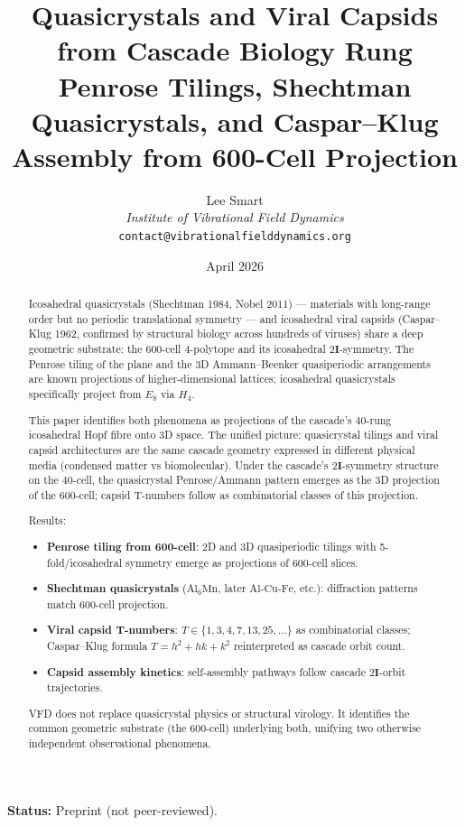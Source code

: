 \documentclass[12pt]{article}
\title{Quasicrystals and Viral Capsids from Cascade Biology Rung\\[6pt]
\large Penrose Tilings, Shechtman Quasicrystals, and Caspar--Klug Assembly from 600-Cell Projection}
\author{Lee Smart\\ \textit{Institute of Vibrational Field Dynamics}\\ \texttt{contact@vibrationalfielddynamics.org}}
\date{April 2026}
\theoremstyle{remark}
\newcommand{\twoI}{2\mathbf{I}}
\begin{document}
\maketitle

\noindent\textbf{Status:} Preprint (not peer-reviewed).

\begin{abstract}
Icosahedral quasicrystals (Shechtman 1984, Nobel 2011) --- materials with long-range order but no periodic translational symmetry --- and icosahedral viral capsids (Caspar--Klug 1962, confirmed by structural biology across hundreds of viruses) share a deep geometric substrate: the 600-cell 4-polytope and its icosahedral $\twoI$-symmetry. The Penrose tiling of the plane and the 3D Ammann--Beenker quasiperiodic arrangements are known projections of higher-dimensional lattices; icosahedral quasicrystals specifically project from $E_8$ via $H_4$.

This paper identifies both phenomena as projections of the cascade's $40$-rung icosahedral Hopf fibre onto 3D space. The unified picture: quasicrystal tilings and viral capsid architectures are the same cascade geometry expressed in different physical media (condensed matter vs biomolecular). Under the cascade's $\twoI$-symmetry structure on the 40-cell, the quasicrystal Penrose/Ammann pattern emerges as the 3D projection of the 600-cell; capsid T-numbers follow as combinatorial classes of this projection.

Results:
\begin{itemize}
\item \textbf{Penrose tiling from 600-cell}: 2D and 3D quasiperiodic tilings with 5-fold/icosahedral symmetry emerge as projections of 600-cell slices.
\item \textbf{Shechtman quasicrystals} ($\mathrm{Al}_6\mathrm{Mn}$, later $\mathrm{Al}$-$\mathrm{Cu}$-$\mathrm{Fe}$, etc.): diffraction patterns match 600-cell projection.
\item \textbf{Viral capsid T-numbers}: $T \in \{1, 3, 4, 7, 13, 25, \ldots\}$ as combinatorial classes; Caspar--Klug formula $T = h^2 + hk + k^2$ reinterpreted as cascade orbit count.
\item \textbf{Capsid assembly kinetics}: self-assembly pathways follow cascade $\twoI$-orbit trajectories.
\end{itemize}

VFD does not replace quasicrystal physics or structural virology. It identifies the common geometric substrate (the 600-cell) underlying both, unifying two otherwise independent observational phenomena.
\end{abstract}
\end{document}
